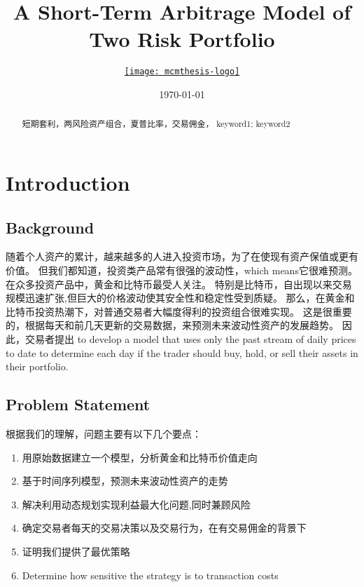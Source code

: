 \documentclass{mcmthesis}
\title{A Short-Term Arbitrage Model of Two Risk Portfolio}
\author{\small \href{https://www.latexstudio.net/}
  {\texttt{[image: mcmthesis-logo]}}}
\date{\today}
\begin{document}
\begin{abstract}


\begin{keywords}
短期套利，两风险资产组合，夏普比率，交易佣金，
keyword1; keyword2


\end{keywords}
\end{abstract}
\maketitle

\newpage
\thispagestyle{empty}
\tableofcontents
\newpage


\section{Introduction}
\subsection{Background}
随着个人资产的累计，越来越多的人进入投资市场，为了在使现有资产保值或更有价值。
但我们都知道，投资类产品常有很强的波动性，which means它很难预测。
在众多投资产品中，黄金和比特币最受人关注。
特别是比特币，自出现以来交易规模迅速扩张,但巨大的价格波动使其安全性和稳定性受到质疑。
那么，在黄金和比特币投资热潮下，对普通交易者大幅度得利的投资组合很难实现。
这是很重要的，根据每天和前几天更新的交易数据，来预测未来波动性资产的发展趋势。
因此，交易者提出 to develop a model that uses only the past stream of daily prices 
to date to determine each day if the trader should buy, hold, or sell their assets in their portfolio.


\subsection{Problem Statement}
根据我们的理解，问题主要有以下几个要点：
\begin{enumerate}    %
  \item 用原始数据建立一个模型，分析黄金和比特币价值走向
  \item 基于时间序列模型，预测未来波动性资产的走势
  \item 解决利用动态规划实现利益最大化问题,同时兼顾风险
  \item 确定交易者每天的交易决策以及交易行为，在有交易佣金的背景下
  \item 证明我们提供了最优策略
  \item Determine how sensitive the strategy is to transaction costs
\end{enumerate}
\end{document}
